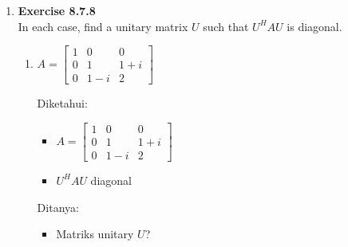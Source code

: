 \documentclass[12pt, a4paper]{scrartcl}
\begin{document}
\begin{enumerate}
\begin{enumerate}
            \end{enumerate}
            
            \item \textbf{Exercise 8.7.8}\\In each case, find a unitary matrix $U$ such that $U^HAU$ is diagonal.
            \setcounter{enumii}{5}
            \begin{enumerate}
                \item $A=\begin{bmatrix}
                    1&0&0\\
                    0&1&1+i\\
                    0&1-i&2
                \end{bmatrix}$

                Diketahui:
                \begin{itemize}
                    \item[] $A=\begin{bmatrix}
                        1&0&0\\
                        0&1&1+i\\
                        0&1-i&2
                    \end{bmatrix}$
                    \item[] $U^HAU$ diagonal
                \end{itemize}

                Ditanya:
                \begin{itemize}
                    \item Matriks unitary $U$?
                \end{itemize}


\end{enumerate}
\end{enumerate}
\end{document}
